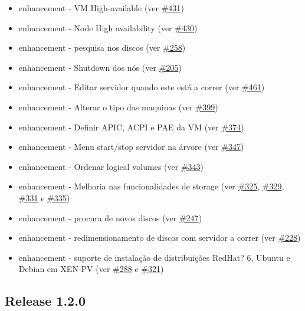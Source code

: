 \begin{itemize}
	\item enhancement - VM High-available (ver \href{https://srcmaster.eurotux.com/pm/p/etva/ticket/431}{\#431})
	\item enhancement - Node High availability (ver \href{https://srcmaster.eurotux.com/pm/p/etva/ticket/430}{\#430})
	\item enhancement - pesquisa nos discos (ver \href{https://srcmaster.eurotux.com/pm/p/etva/ticket/258}{\#258})
	\item enhancement - Shutdown dos nós (ver \href{https://srcmaster.eurotux.com/pm/p/etva/ticket/205}{\#205})
	\item enhancement - Editar servidor quando este está a correr (ver \href{https://srcmaster.eurotux.com/pm/p/etva/ticket/461}{\#461})
	\item enhancement - Alterar o tipo das maquinas (ver \href{https://srcmaster.eurotux.com/pm/p/etva/ticket/399}{\#399})
	\item enhancement - Definir APIC, ACPI e PAE da VM (ver \href{https://srcmaster.eurotux.com/pm/p/etva/ticket/374}{\#374})
	\item enhancement - Menu start/stop servidor na árvore (ver \href{https://srcmaster.eurotux.com/pm/p/etva/ticket/347}{\#347})
	\item enhancement - Ordenar logical volumes (ver \href{https://srcmaster.eurotux.com/pm/p/etva/ticket/343}{\#343})
	\item enhancement - Melhoria nas funcionalidades de storage (ver \href{https://srcmaster.eurotux.com/pm/p/etva/ticket/325}{\#325}, \href{https://srcmaster.eurotux.com/pm/p/etva/ticket/320}{\#329}, \href{https://srcmaster.eurotux.com/pm/p/etva/ticket/331}{\#331} e \href{https://srcmaster.eurotux.com/pm/p/etva/ticket/335}{\#335})
	\item enhancement - procura de novos discos (ver \href{https://srcmaster.eurotux.com/pm/p/etva/ticket/247}{\#247})
	\item enhancement - redimensionamento de discos com servidor a correr (ver \href{https://srcmaster.eurotux.com/pm/p/etva/ticket/228}{\#228})
	\item enhancement - suporte de instalação de distribuições RedHat? 6, Ubuntu e Debian em XEN-PV (ver \href{https://srcmaster.eurotux.com/pm/p/etva/ticket/288}{\#288} e \href{https://srcmaster.eurotux.com/pm/p/etva/ticket/321}{\#321})
\end{itemize}

\subsection{Release 1.2.0}

